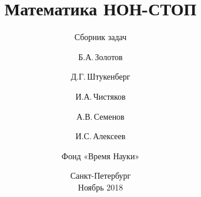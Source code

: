 \subject{\large\textrm{При поддержке Фонда Президентских грантов}
	\vspace{1in}}

\title{\fontsize{25}{25}\selectfont
	Математика НОН-СТОП}
\subtitle{\fontsize{18}{18}\selectfont
	Сборник задач
	\vspace{0.7in}}

\author{Б.А.\,Золотов \and Д.Г.\,Штукенберг \\
	\and И.А.\,Чистяков \and А.В.\,Семенов \and И.С.\,Алексеев \\
	\and Фонд «Время Науки»
	\vspace{1in}}

\date{Санкт-Петербург \\ Ноябрь 2018}